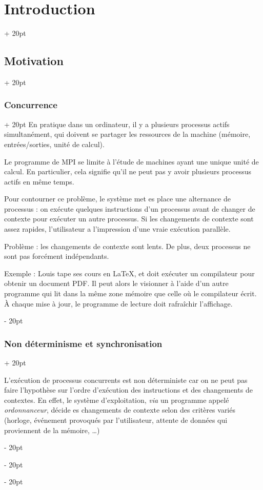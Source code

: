 \documentclass[a4paper, 12pt, twoside]{article}
\newcommand{\ind}[1][20pt]{\advance\leftskip + #1}
\newcommand{\deind}[1][20pt]{\advance\leftskip - #1}
\newenvironment{indt}[2][20pt]{#2 \par \ind[#1]}{\par \deind} %
\begin{document}
\begin{indt}{\section{Introduction}}
\begin{indt}{\subsection{Motivation}}
            \vspace{12pt}
            
            \begin{indt}{\subsubsection{Concurrence}}
                En pratique dans un ordinateur, il y a plusieurs processus actifs simultanément, qui doivent se partager les ressources de la machine (mémoire, entrées/sorties, unité de calcul).

                Le programme de MPI se limite à l'étude de machines ayant une unique unité de calcul.
                En particulier, cela signifie qu'il ne peut pas y avoir plusieurs processus actifs en même temps.

                Pour contourner ce problème, le système met es place une alternance de processus : on exécute quelques instructions d'un processus avant de changer de contexte pour exécuter un autre processus. Si les changements de contexte sont assez rapides, l'utilisateur a l'impression d'une vraie exécution parallèle.

                Problème : les changements de contexte sont lents.
                De plus, deux processus ne sont pas forcément indépendants.

                Exemple : Louis tape ses cours en \LaTeX{}, et doit exécuter un compilateur pour obtenir un document PDF. Il peut alors le visionner à l'aide d'un autre programme qui lit dans la même zone mémoire que celle où le compilateur écrit.
                À chaque mise à jour, le programme de lecture doit rafraîchir l'affichage.
            \end{indt}

            \vspace{12pt}
            
            \begin{indt}{\subsubsection{Non déterminisme et synchronisation}}
                \label{1.1.3}

                L'exécution de processus concurrents est non déterministe car on ne peut pas faire l'hypothèse sur l'ordre d'exécution des instructions et des changements de contextes.
                En effet, le système d'exploitation, \textit{via} un programme appelé \textit{ordonnanceur}, décide es changements de contexte selon des critères variés (horloge, événement provoqués par l'utilisateur, attente de données qui proviennent de la mémoire, \dots)


\end{indt}
\end{indt}
\end{indt}
\end{document}
